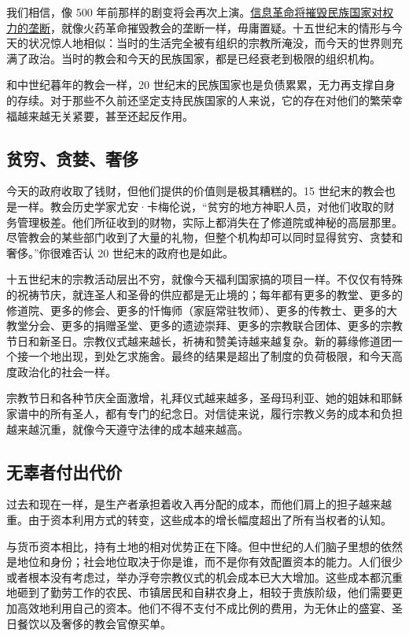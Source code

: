 我们相信，像 500 年前那样的剧变将会再次上演。\uline{信息革命将摧毁民族国家对权力的垄断}，就像火药革命摧毁教会的垄断一样，毋庸置疑。十五世纪末的情形与今天的状况惊人地相似：当时的生活完全被有组织的宗教所淹没，而今天的世界则充满了政治。当时的教会和今天的民族国家，都是已经衰老到极限的组织机构。

和中世纪暮年的教会一样，20 世纪末的民族国家也是负债累累，无力再支撑自身的存续。对于那些不久前还坚定支持民族国家的人来说，它的存在对他们的繁荣幸福越来越无关紧要，甚至还起反作用。

\subsection{贫穷、贪婪、奢侈}
今天的政府收取了钱财，但他们提供的价值则是极其糟糕的。15 世纪末的教会也是一样。教会历史学家尤安·卡梅伦说，“贫穷的地方神职人员，对他们收取的财务管理极差。他们所征收到的财物，实际上都消失在了修道院或神秘的高层那里。尽管教会的某些部门收到了大量的礼物，但整个机构却可以同时显得贫穷、贪婪和奢侈。”你很难否认 20 世纪末的政府也是如此。

十五世纪末的宗教活动层出不穷，就像今天福利国家搞的项目一样。不仅仅有特殊的祝祷节庆，就连圣人和圣骨的供应都是无止境的；每年都有更多的教堂、更多的修道院、更多的修会、更多的忏悔师（家庭常驻牧师）、更多的传教士、更多的大教堂分会、更多的捐赠圣堂、更多的遗迹崇拜、更多的宗教联合团体、更多的宗教节日和新圣日。宗教仪式越来越长，祈祷和赞美诗越来越复杂。新的募缘修道团一个接一个地出现，到处乞求施舍。最终的结果是超出了制度的负荷极限，和今天高度政治化的社会一样。

宗教节日和各种节庆全面激增，礼拜仪式越来越多，圣母玛利亚、她的姐妹和耶稣家谱中的所有圣人，都有专门的纪念日。对信徒来说，履行宗教义务的成本和负担越来越沉重，就像今天遵守法律的成本越来越高。

\subsection{无辜者付出代价}
过去和现在一样，是生产者承担着收入再分配的成本，而他们肩上的担子越来越重。由于资本利用方式的转变，这些成本的增长幅度超出了所有当权者的认知。

与货币资本相比，持有土地的相对优势正在下降。但中世纪的人们脑子里想的依然是地位和身份；社会地位取决于你是谁，而不是你有效配置资本的能力。人们很少或者根本没有考虑过，举办浮夸宗教仪式的机会成本已大大增加。这些成本都沉重地砸到了勤劳工作的农民、市镇居民和自耕农身上，相较于贵族阶级，他们需要更加高效地利用自己的资本。他们不得不支付不成比例的费用，为无休止的盛宴、圣日餐饮以及奢侈的教会官僚买单。

